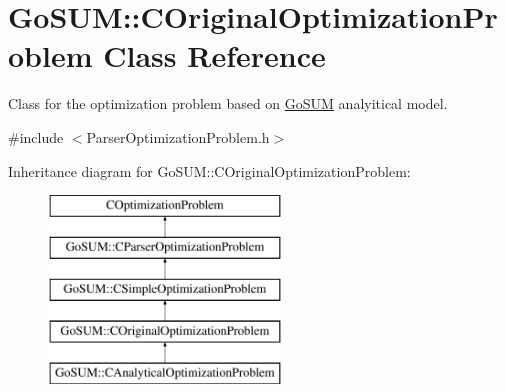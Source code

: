 \hypertarget{class_go_s_u_m_1_1_c_original_optimization_problem}{\section{Go\-S\-U\-M\-:\-:C\-Original\-Optimization\-Problem Class Reference}
\label{class_go_s_u_m_1_1_c_original_optimization_problem}
}


Class for the optimization problem based on \hyperlink{struct_go_s_u_m}{Go\-S\-U\-M} analyitical model.  




{\ttfamily \#include $<$Parser\-Optimization\-Problem.\-h$>$}

Inheritance diagram for Go\-S\-U\-M\-:\-:C\-Original\-Optimization\-Problem\-:\begin{figure}[H]
\begin{center}
\leavevmode
\includegraphics[height=5.000000cm]{class_go_s_u_m_1_1_c_original_optimization_problem}
\end{center}
\end{figure}

